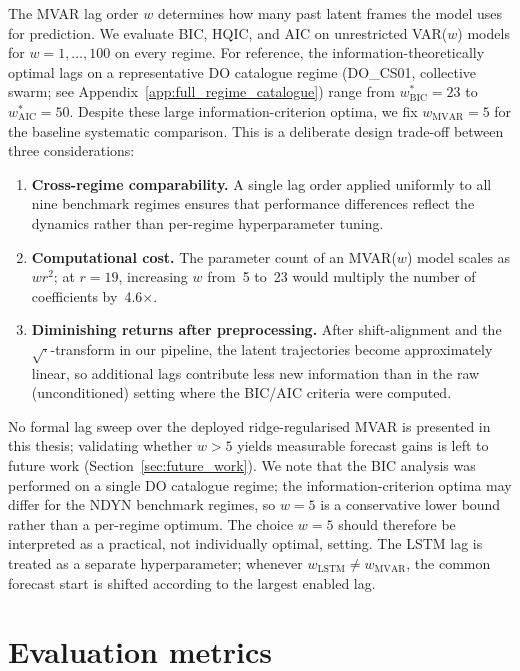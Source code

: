 The MVAR lag order $w$ determines how many past latent frames the model
uses for prediction.  We evaluate BIC, HQIC, and AIC on unrestricted
VAR($w$) models for $w=1,\dots,100$ on every regime.
For reference, the information-theoretically optimal lags on a
representative DO catalogue regime (DO\_CS01, collective swarm; see
Appendix~\ref{app:full_regime_catalogue}) range from
$w^*_{\mathrm{BIC}}=23$ to $w^*_{\mathrm{AIC}}=50$.
Despite these large information-criterion optima, we fix
$w_{\mathrm{MVAR}}=5$ for the baseline systematic comparison.
This is a deliberate design trade-off between three considerations:
\begin{enumerate}[nosep]
\item \textbf{Cross-regime comparability.}  A single lag order applied
      uniformly to all nine benchmark regimes ensures that performance
      differences reflect the dynamics rather than per-regime
      hyperparameter tuning.
\item \textbf{Computational cost.}  The parameter count of an MVAR($w$)
      model scales as $w r^2$; at $r=19$, increasing $w$ from~5 to~23
      would multiply the number of coefficients by~4.6$\times$.
\item \textbf{Diminishing returns after preprocessing.}  After
      shift-alignment and the $\sqrt{\cdot}$-transform in our pipeline,
      the latent trajectories become approximately linear, so additional
      lags contribute less new information than in the raw
      (unconditioned) setting where the BIC/AIC criteria were computed.
\end{enumerate}
No formal lag sweep over the deployed ridge-regularised MVAR is presented
in this thesis; validating whether $w{>}5$ yields measurable forecast
gains is left to future work (Section~\ref{sec:future_work}).
We note that the BIC analysis was performed on a single DO catalogue
regime; the information-criterion optima may differ for the NDYN
benchmark regimes, so $w{=}5$ is a conservative lower bound rather
than a per-regime optimum.
The choice $w{=}5$ should therefore be interpreted as a practical,
not individually optimal, setting.
The LSTM lag is treated as a separate hyperparameter; whenever
$w_{\mathrm{LSTM}}\neq w_{\mathrm{MVAR}}$, the common forecast
start is shifted according to the largest enabled lag.

\section{Evaluation metrics}
\label{sec:metrics}

